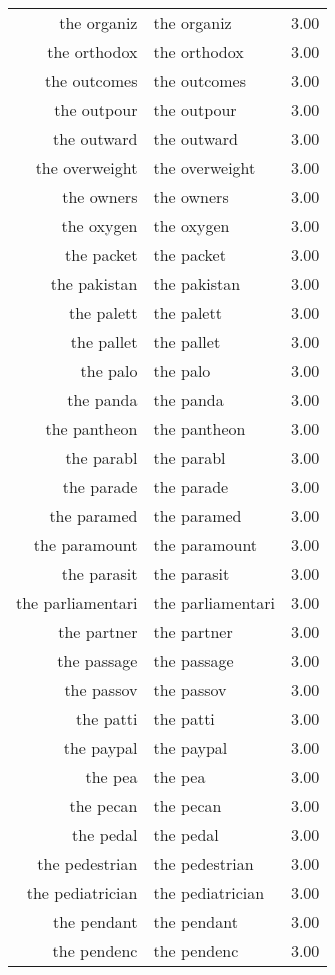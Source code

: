 \begin{table}[ht]
\begin{tabular}{rlr}
  the organiz & the organiz & 3.00 \\ 
  the orthodox & the orthodox & 3.00 \\ 
  the outcomes & the outcomes & 3.00 \\ 
  the outpour & the outpour & 3.00 \\ 
  the outward & the outward & 3.00 \\ 
  the overweight & the overweight & 3.00 \\ 
  the owners & the owners & 3.00 \\ 
  the oxygen & the oxygen & 3.00 \\ 
  the packet & the packet & 3.00 \\ 
  the pakistan & the pakistan & 3.00 \\ 
  the palett & the palett & 3.00 \\ 
  the pallet & the pallet & 3.00 \\ 
  the palo & the palo & 3.00 \\ 
  the panda & the panda & 3.00 \\ 
  the pantheon & the pantheon & 3.00 \\ 
  the parabl & the parabl & 3.00 \\ 
  the parade & the parade & 3.00 \\ 
  the paramed & the paramed & 3.00 \\ 
  the paramount & the paramount & 3.00 \\ 
  the parasit & the parasit & 3.00 \\ 
  the parliamentari & the parliamentari & 3.00 \\ 
  the partner & the partner & 3.00 \\ 
  the passage & the passage & 3.00 \\ 
  the passov & the passov & 3.00 \\ 
  the patti & the patti & 3.00 \\ 
  the paypal & the paypal & 3.00 \\ 
  the pea & the pea & 3.00 \\ 
  the pecan & the pecan & 3.00 \\ 
  the pedal & the pedal & 3.00 \\ 
  the pedestrian & the pedestrian & 3.00 \\ 
  the pediatrician & the pediatrician & 3.00 \\ 
  the pendant & the pendant & 3.00 \\ 
  the pendenc & the pendenc & 3.00 \\ 

\end{tabular}
\end{table}
